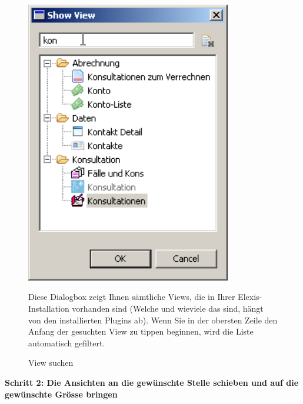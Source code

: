 \begin{figure}[htbp]
     \begin{minipage}{0.4\textwidth}
      \centering
       \includegraphics[width=0.8\textwidth]{images/customize1}
       \caption{View suchen}
       	\label{fig:cust1}
     \end{minipage}\hfill
     \begin{minipage}{0.5\textwidth}
        Diese Dialogbox zeigt Ihnen sämtliche Views, die in Ihrer Elexis-Installation vorhanden sind (Welche und wieviele das sind, hängt von den installierten Plugins ab). Wenn Sie in der obersten Zeile den Anfang der gesuchten View zu tippen beginnen, wird die Liste automatisch gefiltert.\\
        
     \end{minipage}
     
   \end{figure}

 \bigskip

\textbf{Schritt 2: Die Ansichten an die gewünschte Stelle schieben und auf die gewünschte Grösse bringen}\\

